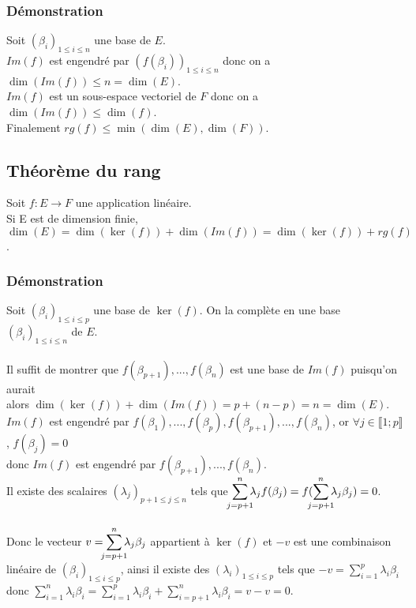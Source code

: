 \documentclass[a4paper,10pt]{book} %
\begin{document}
\subsubsection{Démonstration}
Soit $(\beta_i)_{1\leq i\leq n}$ une base de $E$.\\
$Im(f)$ est engendré par $(f(\beta_i))_{1\leq i\leq n}$ donc on a $\dim(Im(f))\leq n=\dim(E)$.\\
$Im(f)$ est un sous-espace vectoriel de $F$ donc on a $\dim(Im(f))\leq \dim(f)$.\\

Finalement $rg(f)\leq \min(\dim(E),\dim(F))$.

\newpage

\subsection{Théorème du rang}
Soit $f:E\rightarrow F$ une application linéaire.\\
Si E est de dimension finie, $\dim(E)=\dim(\ker(f))+\dim(Im(f))=\dim(\ker(f))+rg(f)$.

\subsubsection{Démonstration}
Soit $(\beta_{i})_{1\leq i\leq p}$ une base de $\ker(f)$. On la complète en une base $(\beta_i)_{1\leq i\leq n}$ de $E$.\\\\
Il suffit de montrer que $f(\beta_{p+1}),...,f(\beta_n)$ est une base de $Im(f)$ puisqu'on aurait\\
alors $\dim(\ker(f))+\dim(Im(f))=p+(n-p)=n=\dim(E)$.\\

$Im(f)$ est engendré par $f(\beta_1),...,f(\beta_p),f(\beta_{p+1}),...,f(\beta_n)$, or $\forall j \in \llbracket 1;p \rrbracket$, $f(\beta_j)=0$\\
donc $Im(f)$ est engendré par $f(\beta_{p+1}),...,f(\beta_n)$.\\

Il existe des scalaires $(\lambda_{j})_{p+1\leq j\leq n}$ tels que $\displaystyle\sum\limits_{\mathclap{j=p+1}}^n\lambda_{j}f(\beta_{j})=f(\sum\limits_{\mathclap{j=p+1}}^n\lambda_j\beta_j)=0$.\\\\
Donc le vecteur $\displaystyle v=\sum\limits_{\mathclap{j=p+1}}^n\lambda_j\beta_j$ appartient à $\ker(f)$ et $-v$ est une combinaison linéaire de $(\beta_i)_{1\leq i\leq p}$, ainsi il existe des $(\lambda_i)_{1\leq i\leq p}$ tels que $-v=\displaystyle\sum\limits_{i=1}^p\lambda_i\beta_i$ donc $\displaystyle\sum\limits_{i=1}^n\lambda_i\beta_i=\sum\limits_{i=1}^p\lambda_i\beta_i+\sum\limits_{i=p+1}^n\lambda_i\beta_i=v-v=0$.
\end{document}
